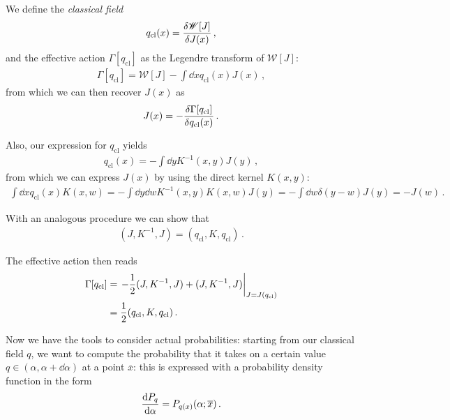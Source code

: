 \documentclass[main.tex]{subfiles}
\begin{document}
We define the \emph{classical field}
%
\begin{align}
q _{\text{cl}}(x) = \fdv{\mathscr{W}[J]}{J(x)}
\,,
\end{align}
%
and the effective action \(\Gamma [q _{\text{cl}}]\) as the Legendre transform of \(\mathscr{W}[J]\): 
%
\begin{align}
\Gamma [q _{\text{cl}}] = \mathscr{W}[J] - \int \dd{x} q _{\text{cl}} (x) J(x) 
\,,
\end{align}
%
from which we can then recover \(J(x)\) as 
%
\begin{align}
J(x) = - \fdv{\Gamma [q _{\text{cl}}]}{q _{\text{cl}}(x)}
\,.
\end{align}

Also, our expression for \(q _{\text{cl}}\) yields 
%
\begin{align}
q _{\text{cl}}(x) = -\int \dd{y} K^{-1}(x, y) J(y) 
\,,
\end{align}
%
from which we can express \(J(x)\) by using the direct kernel \(K(x, y)\): 
%
\begin{align}
\int \dd{x} q _{\text{cl}} (x) K (x, w) = - \int \dd{y} \dd{w} K^{-1}(x, y) K(x, w) J(y) = - \int \dd{w} \delta (y- w) J(y) = - J(w)
\,.
\end{align}

With an analogous procedure we can show that
%
\begin{align}
(J, K^{-1}, J) = (q _{\text{cl}}, K, q _{\text{cl}})
\,.
\end{align}


The effective action then reads
%
\begin{align}
\Gamma [q _{\text{cl}}] &= \eval{- \frac{1}{2} (J, K^{-1}, J) + (J, K^{-1}, J)}_{J = J(q _{\text{cl}})} \\
&= \frac{1}{2} (q _{\text{cl}}, K, q _{\text{cl}})
\,.
\end{align}

Now we have the tools to consider actual probabilities: starting from our classical field \(q\), we want to compute the probability that it takes on a certain value \(q \in (\alpha , \alpha + \dd{\alpha })\) at a point \(\overline{x}\): this is expressed with a probability density function in the form 
%
\begin{align}
\dv{P_q}{\alpha } =P_{q(x)} (\alpha; \overline{x})
\,.
\end{align}
\end{document}

